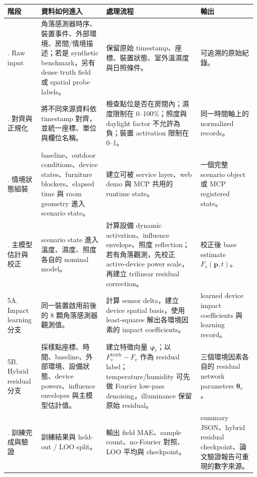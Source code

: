 \documentclass[12pt,a4paper]{article}
\begin{document}
\begin{table}[htbp]
\centering
\footnotesize
\renewcommand{\arraystretch}{1.25}
\begin{tabular}{|>{\raggedright\arraybackslash}p{}|>{\raggedright\arraybackslash}p{}|>{\raggedright\arraybackslash}p{}|>{\raggedright\arraybackslash}p{}|}
\hline
\textbf{階段} & \textbf{資料如何進入} & \textbf{處理流程} & \textbf{輸出} \\
\hline
1. Raw input & 角落感測器時序、裝置事件、外部環境、房間/情境描述；若是 synthetic benchmark，另有 dense truth field 或 spatial probe labels。 & 保留原始 timestamp、座標、裝置狀態、室外溫濕度與日照條件。 & 可追溯的原始紀錄。 \\
\hline
2. 對齊與正規化 & 將不同來源資料依 timestamp 對齊，並統一座標、單位與欄位名稱。 & 檢查點位是否在房間內；濕度限制在 0--100\%；照度與 daylight factor 不允許為負；裝置 activation 限制在 0--1。 & 同一時間軸上的 normalized records。 \\
\hline
3. 情境狀態組裝 & baseline、outdoor conditions、device states、furniture blockers、elapsed time 與 room geometry 進入 scenario state。 & 建立可被 service layer、web demo 與 MCP 共用的 runtime state。 & 一個完整 scenario object 或 MCP registered state。 \\
\hline
4. 主模型估計與校正 & scenario state 進入溫度、濕度、照度各自的 nominal model。 & 計算設備 dynamic activation、influence envelope、照度 reflection；若有角落觀測，先校正 active-device power scale，再建立 trilinear residual correction。 & 校正後 base estimate $F_v(\mathbf{p},t)$。 \\
\hline
5A. Impact learning 分支 & 同一裝置啟用前後的 8 顆角落感測器觀測值。 & 計算 sensor delta，建立 device spatial basis，使用 least-squares 解出各環境因素的 impact coefficients。 & learned device impact coefficients 與 learning record。 \\
\hline
5B. Hybrid residual 分支 & 採樣點座標、時間、baseline、外部環境、設備狀態、device powers、influence envelopes 與主模型估計值。 & 建立特徵向量 $\boldsymbol{\varphi}_i$；以 $F_v^{\text{truth}}-F_v$ 作為 residual label；temperature/humidity 可先做 Fourier low-pass denoising，illuminance 保留原始 residual。 & 三個環境因素各自的 residual network parameters $\boldsymbol{\theta}_v$。 \\
\hline
6. 訓練完成與驗證 & 訓練結果與 held-out / LOO split。 & 輸出 field MAE、sample count、no-Fourier 對照、LOO 平均與 checkpoint。 & summary JSON、hybrid residual checkpoint、論文驗證報告可重現的數字來源。 \\
\hline
\end{tabular}
\end{table}
\end{document}
